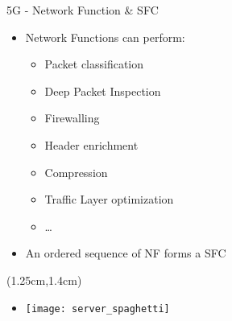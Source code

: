 \begin{frame}{5G - Network Function \& SFC}

  \begin{itemize}
  \item[]<1-> Network Functions can perform:
    \begin{itemize}
    \item<2-> Packet classification
    \item<3-> Deep Packet Inspection
    \item<4-> Firewalling
    \item<5-> Header enrichment
    \item<6-> Compression
    \item<7-> Traffic Layer optimization
    \item<8-> \dots
    \end{itemize}
  \item[]<9-> An ordered sequence of NF forms a SFC

  \end{itemize}

  \begin{textblock*}{5cm}(1.25cm,1.4cm)
    \begin{itemize}
      \item[]<10-> \texttt{[image: server\_spaghetti]}
    \end{itemize}
  \end{textblock*}
\end{frame}

